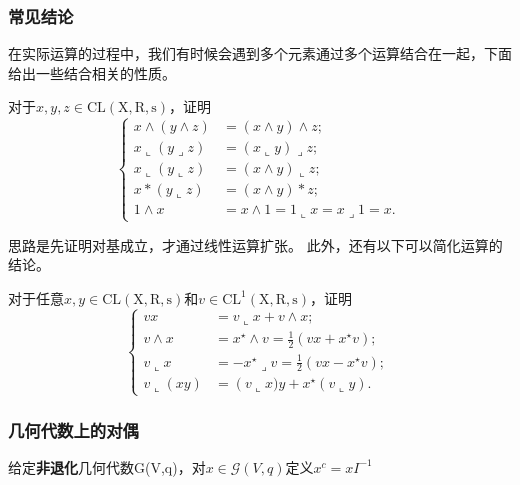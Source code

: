 \subsubsection{常见结论}
在实际运算的过程中，我们有时候会遇到多个元素通过多个运算结合在一起，下面给出一些结合相关的性质。
\begin{exercise}{}
对于$x,y,z\in\mathrm {CL(X,R,s)}$，证明
\begin{equation}
\left\{\begin{aligned}
x \wedge(y \wedge z) & =(x \wedge y) \wedge z ;\\
x\llcorner(y\lrcorner z) & =(x\llcorner y)\lrcorner z ;\\
x\llcorner(y\llcorner z) & =(x \wedge y)\llcorner z; \\
x *(y\llcorner z) & =(x \wedge y) * z ; \\
1 \wedge x & =x \wedge 1=1\llcorner x=x\lrcorner 1=x .
\end{aligned}\right.~
\end{equation}
\end{exercise}

思路是先证明对基成立，才通过线性运算扩张。
此外，还有以下可以简化运算的结论。
\begin{exercise}{}
对于任意$x,y\in\mathrm {CL(X,R,s)}$和$v\in \mathrm{CL^1(X,R,s)}$，证明
\begin{equation}
\left\{\begin{aligned}
v x&=v\llcorner x+v \wedge x ; \\
v \wedge x&=x^{\star} \wedge v=\frac{1}{2}\left(v x+x^{\star} v\right) ; \\
v\llcorner x&=-x^{\star}\lrcorner v=\frac{1}{2}\left(v x-x^{\star} v\right) ; \\
v\llcorner(x y)&=\left(v\llcorner x) y+x^{\star}(v\llcorner y) .\right.
\end{aligned}\right.~
\end{equation}
\end{exercise}
\subsubsection{几何代数上的对偶}
\begin{definition}{}
给定\textbf{非退化}几何代数\mathcal G(V,q)，对$x\in\mathcal G(V,q)$定义$x^c=xI^{-1}$
\end{definition}